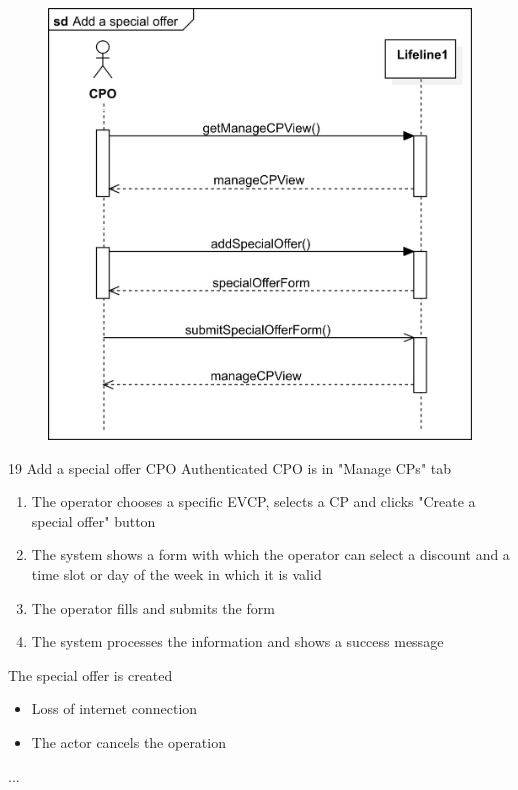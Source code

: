 \usecase
{
    \begin{figure}[H]
        \centering
        \includegraphics[scale=0.9]{src/sequence_diagram/specialOffer.png}
    \end{figure}
}
{19}
{Add a special offer} %
{CPO} %
{Authenticated CPO is in "Manage CPs" tab} %
{ %
    \begin{enumerate}
        \item The operator chooses a specific EVCP, selects a CP and clicks "Create a special offer" button
        \item The system shows a form with which the operator can select a discount and a time slot or day of the week in which it is valid
        \item The operator fills and submits the form
        \item The system processes the information and shows a success message
    \end{enumerate}
}
{The special offer is created} %
{ %
    \begin{itemize}
        \item Loss of internet connection
        \item The actor cancels the operation
    \end{itemize}
}
{ %
    ...
}

